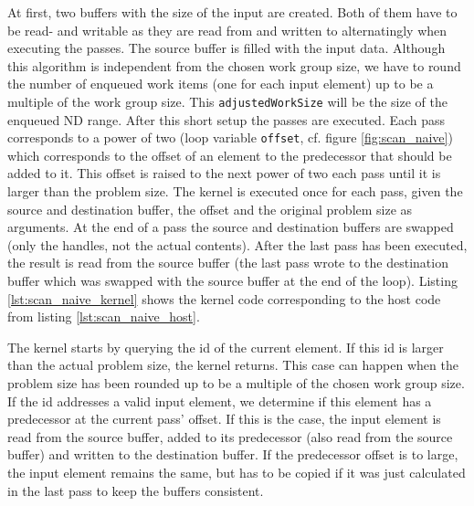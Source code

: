 At first, two buffers with the size of the input are created. Both of them have to be read- and writable as they are read from and written to alternatingly when executing the passes. The source buffer is filled with the input data. Although this algorithm is independent from the chosen work group size, we have to round the number of enqueued work items (one for each input element) up to be a multiple of the work group size. This \lstinline!adjustedWorkSize! will be the size of the enqueued ND range. After this short setup the passes are executed. Each pass corresponds to a power of two (loop variable \lstinline!offset!, cf. figure \ref{fig:scan_naive}) which corresponds to the offset of an element to the predecessor that should be added to it. This offset is raised to the next power of two each pass until it is larger than the problem size. The kernel is executed once for each pass, given the source and destination buffer, the offset and the original problem size as arguments. At the end of a pass the source and destination buffers are swapped (only the handles, not the actual contents). After the last pass has been executed, the result is read from the source buffer (the last pass wrote to the destination buffer which was swapped with the source buffer at the end of the loop).
Listing \ref{lst:scan_naive_kernel} shows the kernel code corresponding to the host code from listing \ref{lst:scan_naive_host}.



The kernel starts by querying the id of the current element. If this id is larger than the actual problem size, the kernel returns. This case can happen when the problem size has been rounded up to be a multiple of the chosen work group size. If the id addresses a valid input element, we determine if this element has a predecessor at the current pass' offset. If this is the case, the input element is read from the source buffer, added to its predecessor (also read from the source buffer) and written to the destination buffer. If the predecessor offset is to large, the input element remains the same, but has to be copied if it was just calculated in the last pass to keep the buffers consistent.


